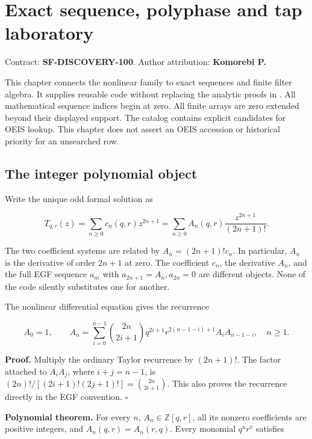 \hypertarget{exact-sequence-polyphase-and-tap-laboratory}{%
\section{Exact sequence, polyphase and tap
laboratory}\label{exact-sequence-polyphase-and-tap-laboratory}}

Contract: \textbf{SF-DISCOVERY-100}. Author attribution:
\textbf{Komorebi P.}

This chapter connects the nonlinear family to exact sequences and finite
filter algebra. It supplies reusable code without replacing the analytic
proofs in . All mathematical
sequence indices begin at zero. All finite arrays are zero extended
beyond their displayed support. The catalog contains explicit candidates
for OEIS lookup. This chapter does not assert an OEIS accession or
historical priority for an unsearched row.

\hypertarget{the-integer-polynomial-object}{%
\subsection{The integer polynomial
object}\label{the-integer-polynomial-object}}

Write the unique odd formal solution as

\[
T_{q,r}(z)=\sum_{n\ge0}c_n(q,r)z^{2n+1}
          =\sum_{n\ge0}A_n(q,r)\frac{z^{2n+1}}{(2n+1)!}.
\]

The two coefficient systems are related by \(A_n=(2n+1)!c_n\). In
particular, \(A_n\) is the derivative of order \(2n+1\) at zero. The
coefficient \(c_n\), the derivative \(A_n\), and the full EGF sequence
\(a_m\) with \(a_{2n+1}=A_n, a_{2n}=0\) are different objects. None of
the code silently substitutes one for another.

The nonlinear differential equation gives the recurrence

\[
\boxed{
A_0=1,\qquad
A_n=\sum_{i=0}^{n-1}\binom{2n}{2i+1}
 q^{2i+1}r^{2(n-1-i)+1}A_i A_{n-1-i},\quad n\ge1.}
\]

\textbf{Proof.} Multiply the ordinary Taylor recurrence by \((2n+1)!\).
The factor attached to \(A_iA_j\), where \(i+j=n-1\), is
\((2n)!/[(2i+1)!(2j+1)!]=\binom{2n}{2i+1}\). This also proves the
recurrence directly in the EGF convention. \(\square\)

\textbf{Polynomial theorem.} For every \(n\), \(A_n\in\mathbb Z[q,r]\),
all its nonzero coefficients are positive integers, and
\(A_n(q,r)=A_n(r,q)\). Every monomial \(q^u r^v\) satisfies

